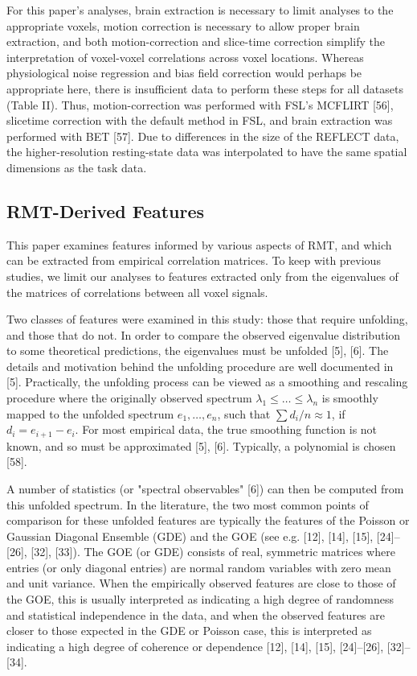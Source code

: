 For this paper’s analyses, brain extraction is necessary to limit analyses to the appropriate
voxels, motion correction is necessary to allow proper brain extraction, and both motion-correction
and slice-time correction simplify the interpretation of voxel-voxel correlations across voxel
locations. Whereas physiological noise regression and bias field correction would perhaps be
appropriate here, there is insufficient data to perform these steps for all datasets (Table II).
Thus, motion-correction was performed with FSL's MCFLIRT [56], slicetime correction with the default
method in FSL, and brain extraction was performed with BET [57]. Due to differences in the size of
the REFLECT data, the higher-resolution resting-state data was interpolated to have the same spatial
dimensions as the task data.

\subsection{RMT-Derived Features}
This paper examines features informed by various aspects of RMT, and which can be extracted from
empirical correlation matrices. To keep with previous studies, we limit our analyses to features
extracted only from the eigenvalues of the matrices of correlations between all voxel signals.

Two classes of features were examined in this study: those that require unfolding, and those that do
not. In order to compare the observed eigenvalue distribution to some theoretical predictions, the
eigenvalues must be unfolded [5], [6]. The details and motivation behind the unfolding procedure are
well documented in [5]. Practically, the unfolding process can be viewed as a smoothing and
rescaling procedure where the originally observed spectrum \(\lambda_1 \le \dots \le \lambda_n\) is
smoothly mapped to the unfolded spectrum \(e_1, \dots, e_n\), such that \(\sum d_i/n \approx 1\),
if \(d_i = e_{i+1} - e_i \). For most empirical data, the true smoothing function is not known, and
so must be approximated [5], [6]. Typically, a polynomial is chosen [58].

A number of statistics (or "spectral observables" [6]) can then be computed from this unfolded
spectrum. In the literature, the two most common points of comparison for these unfolded features
are typically the features of the Poisson or Gaussian Diagonal Ensemble (GDE) and the GOE (see e.g.
[12], [14], [15], [24]–[26], [32], [33]). The GOE (or GDE) consists of real, symmetric matrices
where entries (or only diagonal entries) are normal random variables with zero mean and unit
variance. When the empirically observed features are close to those of the GOE, this is usually
interpreted as indicating a high degree of randomness and statistical independence in the data, and
when the observed features are closer to those expected in the GDE or Poisson case, this is
interpreted as indicating a high degree of coherence or dependence [12], [14], [15], [24]–[26],
[32]–[34].

